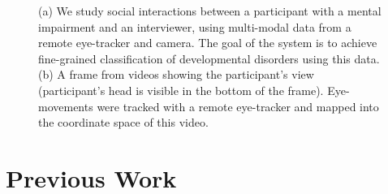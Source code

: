 \documentclass{llncs}
\begin{document}
  \begin{figure}%
    \hfill

    \label{fig:pull_figure}
    \caption{(a) We study social interactions between a participant with a mental impairment and an interviewer, using multi-modal data from a remote eye-tracker and camera. The goal of the system is to achieve fine-grained classification of developmental disorders using this data. (b) A frame from videos showing the participant's view (participant's head is visible in the bottom of the frame). Eye-movements were tracked with a remote eye-tracker and mapped into the coordinate space of this video.
    }
  \end{figure}
  \vspace{-3em}
  \section {Previous Work}
  \vspace{-1em}
\end{document}
